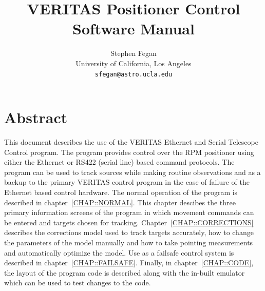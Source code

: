 \documentclass[letterpaper,12pt]{report}
\begin{document}
\thispagestyle{empty}
\title{VERITAS Positioner Control Software Manual}
\author{Stephen Fegan \\ University of California, Los Angeles \\ \texttt{sfegan@astro.ucla.edu} }
\maketitle

\thispagestyle{empty}
\vspace*{\fill}
\centerline{\setlength{\fboxrule}{3pt}\setlength{\fboxsep}{.2in}
}
\vspace*{\fill}

\chapter*{Abstract}
\thispagestyle{fancy}
\setcounter{page}{1}

This document describes the use of the VERITAS Ethernet and Serial
Telescope Control program. The program provides control over the RPM
positioner using either the Ethernet or RS422 (serial line) based
command protocols. The program can be used to track sources while
making routine observations and as a backup to the primary VERITAS
control program in the case of failure of the Ethernet based control
hardware. The normal operation of the program is described in
chapter~\ref{CHAP::NORMAL}. This chapter descibes the three primary
information screens of the program in which movement commands can be
entered and targets chosen for tracking. 
Chapter~\ref{CHAP::CORRECTIONS} describes the corrections model used
to track targets accurately, how to change the parameters of the model
manually and how to take pointing measurements and automatically
optimize the model. Use as a failsafe control system is described in
chapter~\ref{CHAP::FAILSAFE}. Finally, in chapter~\ref{CHAP::CODE},
the layout of the program code is described along with the in-built
emulator which can be used to test changes to the code.
\end{document}
